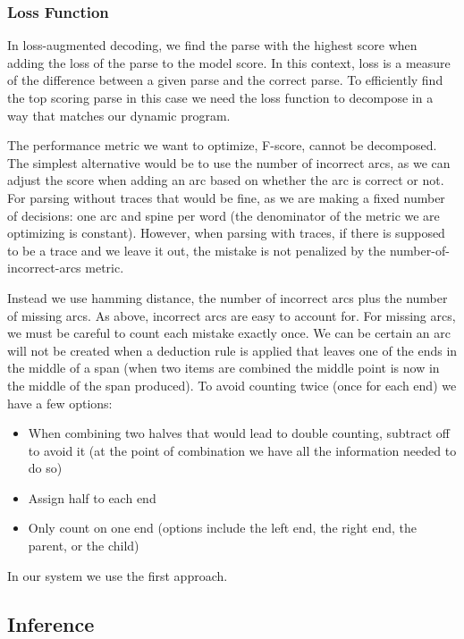 
\subsubsection{Loss Function}

In loss-augmented decoding, we find the parse with the highest score when adding the loss of the parse to the model score.
In this context, loss is a measure of the difference between a given parse and the correct parse.
To efficiently find the top scoring parse in this case we need the loss function to decompose in a way that matches our dynamic program.

The performance metric we want to optimize, F-score, cannot be decomposed.
The simplest alternative would be to use the number of incorrect arcs, as we can adjust the score when adding an arc based on whether the arc is correct or not.
For parsing without traces that would be fine, as we are making a fixed number of decisions: one arc and spine per word (\myie the denominator of the metric we are optimizing is constant).
However, when parsing with traces, if there is supposed to be a trace and we leave it out, the mistake is not penalized by the number-of-incorrect-arcs metric.

Instead we use hamming distance, the number of incorrect arcs plus the number of missing arcs.
As above, incorrect arcs are easy to account for.
For missing arcs, we must be careful to count each mistake exactly once.
We can be certain an arc will not be created when a deduction rule is applied that leaves one of the ends in the middle of a span (\myeg when two items are combined the middle point is now in the middle of the span produced).
To avoid counting twice (once for each end) we have a few options:

\begin{itemize}
  \item When combining two halves that would lead to double counting, subtract off to avoid it (at the point of combination we have all the information needed to do so)
  \item Assign half to each end
  \item Only count on one end (options include the left end, the right end, the parent, or the child)
\end{itemize}

In our system we use the first approach.

\subsection{Inference}

